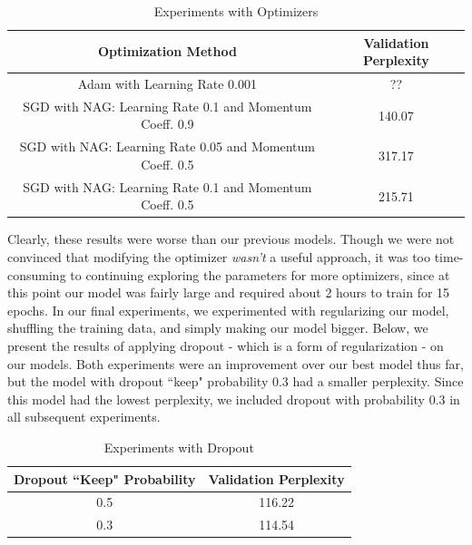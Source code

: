 \documentclass[a4paper]{article}
\begin{document}
\begin{table}[h!]
\centering
\begin{tabular}{|c | c|} 
 \hline
Optimization Method & Validation Perplexity \\ \hline \hline
Adam with Learning Rate 0.001 & ?? \\ \hline
SGD with NAG: Learning Rate 0.1 and Momentum Coeff. 0.9 & 140.07\\ \hline
SGD with NAG: Learning Rate 0.05 and Momentum Coeff. 0.5 & 317.17 \\ \hline
SGD with NAG: Learning Rate 0.1 and Momentum Coeff. 0.5 &215.71 \\ \hline
\end{tabular}
\caption{Experiments with Optimizers}
\label{table:1}
\end{table}
Clearly, these results were worse than our previous models. Though we were not convinced that modifying the optimizer \textit{wasn't} a useful approach, it was too time-consuming to continuing exploring the parameters for more optimizers, since at this point our model was fairly large and required about 2 hours to train for 15 epochs. 
\newline
\newline
In our final experiments, we experimented with regularizing our model, shuffling the training data, and simply making our model bigger. Below, we present the results of applying dropout - which is a form of regularization - on our models. Both experiments were an improvement over our best model thus far, but the model with dropout ``keep" probability 0.3 had a smaller perplexity. Since this model had the lowest perplexity, we included dropout with probability 0.3 in all subsequent experiments.

\begin{table}[h!]
\centering
\begin{tabular}{|c | c|} 
 \hline
Dropout ``Keep" Probability & Validation Perplexity \\ \hline \hline
0.5 & 116.22 \\ \hline
0.3 & 114.54\\ \hline
\end{tabular}
\caption{Experiments with Dropout}
\label{table:1}
\end{table}
\end{document}
